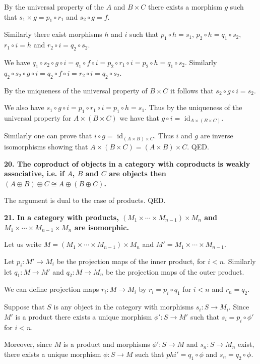 \documentclass[12pt]{article}
\begin{document}
By the universal property of the $A$ and $B\times C$ there exists a morphism $g$ such that $s_1\times g = p_1\circ r_1$ and $s_2\circ g = f$.

Similarly there exist morphisms $h$ and $i$ such that $p_1\circ h = s_1$, $p_2\circ h = q_1\circ s_2$, $r_1\circ i = h$ and $r_2\circ i = q_2\circ s_2$.

We have $q_1\circ s_2\circ g\circ i = q_1\circ f\circ i = p_2\circ r_1\circ i = p_2\circ h = q_1\circ s_2$. Similarly $q_2\circ s_2\circ g\circ i = q_2\circ f\circ i = r_2\circ i = q_2\circ s_2$.

By the uniqueness of the universal property of $B\times C$ it follows that $s_2\circ g\circ i = s_2$.

We also have $s_1\circ g\circ i = p_1\circ r_1\circ i = p_1\circ h = s_1$. Thus by the uniqueness of the universal property for $A\times (B\times C)$ we have that $g\circ i =$ id$_{A\times(B\times C)}$.

Similarly one can prove that $i\circ g =$ id$_{(A\times B)\times C}$. Thus $i$ and $g$ are inverse isomorphisms showing that $A\times(B\times C) = (A\times B)\times C$. QED.

\textbf{20. The coproduct of objects in a category with coproducts is weakly associative, i.e. if $A$, $B$ and $C$ are objects then $(A\oplus B)\oplus C \cong A\oplus (B\oplus C)$.}

The argument is dual to the case of products. QED.

\textbf{21. In a category with products, $(M_1\times \cdots \times M_{n-1})\times M_n$ and $M_1\times \cdots \times M_{n-1}\times M_n$ are isomorphic.}

Let us write $M = (M_1\times \cdots \times M_{n-1})\times M_n$ and $M' = M_1\times \cdots \times M_{n-1}$.

Let $p_i : M' \to M_i$ be the projection maps of the inner product, for $i < n$. Similarly let $q_1 : M \to M'$ and $q_2 : M \to M_n$ be the projection maps of the outer product.

We can define projection maps $r_i : M \to M_i$ by $r_i = p_i\circ q_1$ for $i < n$ and $r_n = q_2$.

Suppose that $S$ is any object in the category with morphisms $s_i : S \to M_i$. Since $M'$ is a product there exists a unique morphism $\phi' : S \to M'$ such that $s_i = p_i\circ \phi'$ for $i < n$.

Moreover, since $M$ is a product and morphisms $\phi' : S \to M$ and $s_n : S \to M_n$ exist, there exists a unique morphism $\phi : S \to M$ such that $phi' = q_1\circ \phi$ and $s_n = q_2\circ \phi$.
\end{document}
